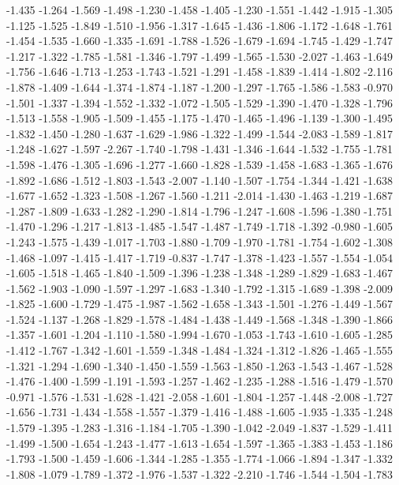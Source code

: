 \documentclass[9pt]{article}
\theoremstyle{plain}
\theoremstyle{definition}
\theoremstyle{remark}
\numberwithin{equation}{section}
\begin{document}
-1.435
-1.264
-1.569
-1.498
-1.230
-1.458
-1.405
-1.230
-1.551
-1.442
-1.915
-1.305
-1.125
-1.525
-1.849
-1.510
-1.956
-1.317
-1.645
-1.436
-1.806
-1.172
-1.648
-1.761
-1.454
-1.535
-1.660
-1.335
-1.691
-1.788
-1.526
-1.679
-1.694
-1.745
-1.429
-1.747
-1.217
-1.322
-1.785
-1.581
-1.346
-1.797
-1.499
-1.565
-1.530
-2.027
-1.463
-1.649
-1.756
-1.646
-1.713
-1.253
-1.743
-1.521
-1.291
-1.458
-1.839
-1.414
-1.802
-2.116
-1.878
-1.409
-1.644
-1.374
-1.874
-1.187
-1.200
-1.297
-1.765
-1.586
-1.583
-0.970
-1.501
-1.337
-1.394
-1.552
-1.332
-1.072
-1.505
-1.529
-1.390
-1.470
-1.328
-1.796
-1.513
-1.558
-1.905
-1.509
-1.455
-1.175
-1.470
-1.465
-1.496
-1.139
-1.300
-1.495
-1.832
-1.450
-1.280
-1.637
-1.629
-1.986
-1.322
-1.499
-1.544
-2.083
-1.589
-1.817
-1.248
-1.627
-1.597
-2.267
-1.740
-1.798
-1.431
-1.346
-1.644
-1.532
-1.755
-1.781
-1.598
-1.476
-1.305
-1.696
-1.277
-1.660
-1.828
-1.539
-1.458
-1.683
-1.365
-1.676
-1.892
-1.686
-1.512
-1.803
-1.543
-2.007
-1.140
-1.507
-1.754
-1.344
-1.421
-1.638
-1.677
-1.652
-1.323
-1.508
-1.267
-1.560
-1.211
-2.014
-1.430
-1.463
-1.219
-1.687
-1.287
-1.809
-1.633
-1.282
-1.290
-1.814
-1.796
-1.247
-1.608
-1.596
-1.380
-1.751
-1.470
-1.296
-1.217
-1.813
-1.485
-1.547
-1.487
-1.749
-1.718
-1.392
-0.980
-1.605
-1.243
-1.575
-1.439
-1.017
-1.703
-1.880
-1.709
-1.970
-1.781
-1.754
-1.602
-1.308
-1.468
-1.097
-1.415
-1.417
-1.719
-0.837
-1.747
-1.378
-1.423
-1.557
-1.554
-1.054
-1.605
-1.518
-1.465
-1.840
-1.509
-1.396
-1.238
-1.348
-1.289
-1.829
-1.683
-1.467
-1.562
-1.903
-1.090
-1.597
-1.297
-1.683
-1.340
-1.792
-1.315
-1.689
-1.398
-2.009
-1.825
-1.600
-1.729
-1.475
-1.987
-1.562
-1.658
-1.343
-1.501
-1.276
-1.449
-1.567
-1.524
-1.137
-1.268
-1.829
-1.578
-1.484
-1.438
-1.449
-1.568
-1.348
-1.390
-1.866
-1.357
-1.601
-1.204
-1.110
-1.580
-1.994
-1.670
-1.053
-1.743
-1.610
-1.605
-1.285
-1.412
-1.767
-1.342
-1.601
-1.559
-1.348
-1.484
-1.324
-1.312
-1.826
-1.465
-1.555
-1.321
-1.294
-1.690
-1.340
-1.450
-1.559
-1.563
-1.850
-1.263
-1.543
-1.467
-1.528
-1.476
-1.400
-1.599
-1.191
-1.593
-1.257
-1.462
-1.235
-1.288
-1.516
-1.479
-1.570
-0.971
-1.576
-1.531
-1.628
-1.421
-2.058
-1.601
-1.804
-1.257
-1.448
-2.008
-1.727
-1.656
-1.731
-1.434
-1.558
-1.557
-1.379
-1.416
-1.488
-1.605
-1.935
-1.335
-1.248
-1.579
-1.395
-1.283
-1.316
-1.184
-1.705
-1.390
-1.042
-2.049
-1.837
-1.529
-1.411
-1.499
-1.500
-1.654
-1.243
-1.477
-1.613
-1.654
-1.597
-1.365
-1.383
-1.453
-1.186
-1.793
-1.500
-1.459
-1.606
-1.344
-1.285
-1.355
-1.774
-1.066
-1.894
-1.347
-1.332
-1.808
-1.079
-1.789
-1.372
-1.976
-1.537
-1.322
-2.210
-1.746
-1.544
-1.504
-1.783
\end{document}
